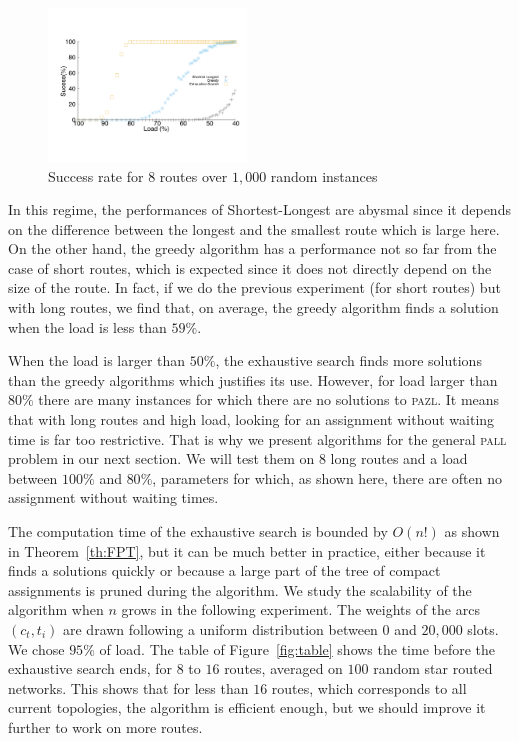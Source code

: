 \documentclass[10pt, conference, letterpaper]{IEEEtran}
\newcommand\pazl{\textsc{pazl}\xspace}
\newcommand\pall{\textsc{pall}\xspace}
\begin{document}
\begin{figure}[h]

       \begin{center}
      \includegraphics[width=0.47\textwidth]{echec_longues.pdf}
      \end{center}
       
      \caption{Success rate for $8$ routes over $1,000$ random instances}\label{fig:long}
     \end{figure}
      
      In this regime, the performances of Shortest-Longest are abysmal since it depends on the difference between the longest and the smallest route which is large here. On the other hand, the greedy algorithm has a performance not so far from the case of short routes, which is expected since it does not directly depend on the size of the route. In fact, if we do the previous experiment  (for short routes) but with long routes, we find that, on average, the greedy algorithm finds a solution when the load is less than $59\%$.
      
      When the load is larger than $50\%$, the exhaustive search finds more solutions than the greedy algorithms which justifies its use. However, for load larger than $80\%$ there are many instances for which there are no solutions to \pazl.
      It means that with long routes and high load, looking for an assignment without waiting time is far too restrictive. That is why we present algorithms for the general \pall problem in our next section. We will test them on $8$ long routes and a load between $100\%$ and $80\%$, parameters for which, as shown here, there are often no assignment without waiting times.
      
      The computation time of the exhaustive search is bounded by $O(n!)$ as shown in Theorem~\ref{th:FPT}, 
      but it can be much better in practice, either because it finds a solutions quickly or because a large part of the tree of 
      compact assignments is pruned during the algorithm. We study the scalability  of the algorithm when $n$ grows in the following experiment. The weights of the arcs $(c_t,t_i)$ are drawn following a uniform distribution between $0$ and $20,000$ slots. We chose  $95\%$ of load.  The table of Figure~\ref{fig:table} shows the time before the exhaustive search ends, for $8$ to $16$ routes, averaged on $100$ random star routed networks. This shows that for less than $16$ routes, which corresponds to all current topologies, the algorithm is efficient enough, but we should improve it further to work on more routes.
      
\end{document}
